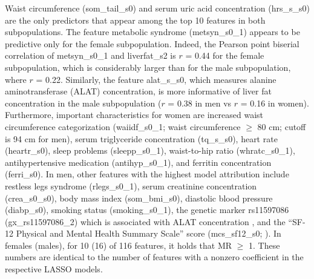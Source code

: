 \documentclass[
  oneside]{book}
\begin{document}
Waist circumference (som\_tail\_s0) and serum uric acid concentration (hrs\_s\_s0) are the only predictors that appear among the top 10 features in both subpopulations.
The feature metabolic syndrome (metsyn\_s0\_1) appears to be predictive only for the female subpopulation.
Indeed, the Pearson point biserial correlation of metsyn\_s0\_1 and liverfat\_s2 is \(r\) = 0.44 for the female subpopulation, which is considerably larger than for the male subpopulation, where \(r\) = 0.22.
Similarly, the feature alat\_s\_s0, which measures alanine aminotransferase (ALAT) concentration, is more informative of liver fat concentration in the male subpopulation (\(r\) = 0.38 in men vs \(r\) = 0.16 in women).
Furthermore, important characteristics for women are increased waist circumference categorization (waiidf\_s0\_1; waist circumference \(\geq\) 80 cm; cutoff is 94 cm for men), serum triglyceride concentration (tq\_s\_s0), heart rate (heartr\_s0), sleep problems (sleepp\_s0\_1), waist-to-hip ratio (whratc\_s0\_1), antihypertensive medication (antihyp\_s0\_1), and ferritin concentration (ferri\_s0).
In men, other features with the highest model attribution include restless legs syndrome (rlegs\_s0\_1), serum creatinine concentration (crea\_s0\_s0), body mass index (som\_bmi\_s0), diastolic blood pressure (diabp\_s0), smoking status (smoking\_s0\_1), the genetic marker rs11597086 (gx\_rs11597086\_2) which is associated with ALAT concentration \autocite{yuan2008population}, and the ``SF-12 Physical and Mental Health Summary Scale'' score (mcs\_sf12\_s0; \autocite{bullinger1995german}).
In females (males), for 10 (16) of 116 features, it holds that MR \(\geq\) 1. These numbers are identical to the number of features with a nonzero coefficient in the respective LASSO models.
\end{document}
